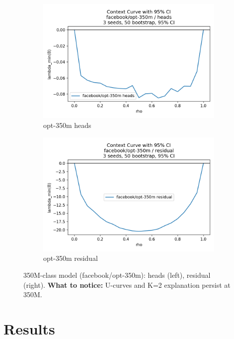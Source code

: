 \documentclass[11pt]{article}
\newcommand{\1}{\mathbf{1}}
\begin{document}
\begin{figure}[t]
\centering
\begin{subfigure}[t]{0.48\textwidth}
\includegraphics[width=\linewidth]{figs/curve_facebook_opt-350m_heads.png}
\caption{opt-350m heads}
\end{subfigure}\hfill
\begin{subfigure}[t]{0.48\textwidth}
\includegraphics[width=\linewidth]{figs/curve_facebook_opt-350m_residual.png}
\caption{opt-350m residual}
\end{subfigure}
\caption{350M-class model (facebook/opt-350m): heads (left), residual (right). \textbf{What to notice:} U-curves and K{=}2 explanation persist at 350M.}
\label{fig:curve_opt350m}
\end{figure}

\section{Results}
\end{document}
